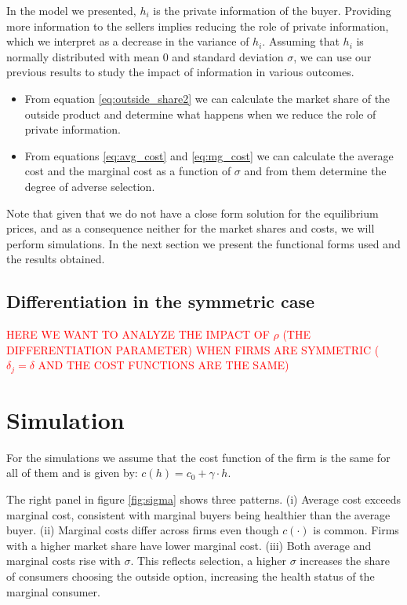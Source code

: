 \documentclass[12pt]{article}
\theoremstyle{plain}
\theoremstyle{plain}
\begin{document}
In the model we presented, $h_i$ is the private information of the buyer. Providing more information to the sellers implies reducing the role of private information, which we interpret as a decrease in the variance of $h_i$. Assuming that $h_i$ is normally distributed with mean $0$ and standard deviation $\sigma$, we can use our previous results to study the impact of information in various outcomes.

\begin{itemize}
    \item From equation \ref{eq:outside_share2} we can calculate the market share of the outside product and determine what happens when we reduce the role of private information. 

    \item From equations \ref{eq:avg_cost} and \ref{eq:mg_cost} we can calculate the average cost and the marginal cost as a function of $\sigma$ and from them determine the degree of adverse selection. 

\end{itemize}


Note that given that we do not have a close form solution for the equilibrium prices, and as a consequence neither for the market shares and costs, we will perform simulations. In the next section we present the functional forms used and the results obtained. 

\newpage



\subsection{Differentiation in the symmetric case}

\textcolor{red}{HERE WE WANT TO ANALYZE THE IMPACT OF  $\rho$ (THE DIFFERENTIATION PARAMETER) WHEN FIRMS ARE SYMMETRIC ($\delta_j = \delta$ AND THE COST FUNCTIONS ARE THE SAME) }



\section{Simulation}\label{sec:simulation}

For the simulations we assume that the cost function of the firm is the same for all of them and is given by: 
$c(h) = c_0 + \gamma \cdot h$. 



The right panel in figure \ref{fig:sigma}   shows three patterns. (i) Average cost exceeds marginal cost, consistent with marginal buyers being healthier than the average buyer. (ii) Marginal costs differ across firms even though  $c(\cdot)$ is common. Firms with a higher market share have lower marginal cost.  (iii) Both average and marginal costs rise with $\sigma$. This reflects selection, a higher $\sigma$ increases the share of consumers choosing the outside option, increasing the health status of the marginal consumer. 
\end{document}
